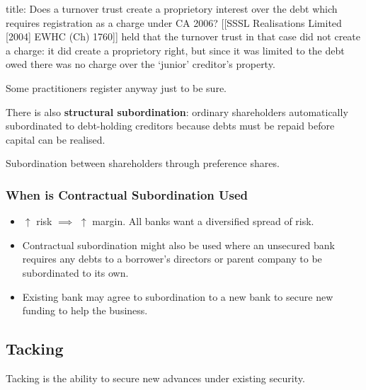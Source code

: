 \documentclass[
]{article}
\newenvironment{Shaded}{}{}
\newcommand{\NormalTok}[1]{#1}
\providecommand{\tightlist}{%
  \setlength{\itemsep}{0pt}\setlength{\parskip}{0pt}}
\begin{document}
\begin{Shaded}
\begin{Highlighting}[]
\NormalTok{title: Does a turnover trust create a proprietory interest over the debt which requires registration as a charge under CA 2006?}
\NormalTok{[[SSSL Realisations Limited [2004] EWHC (Ch) 1760]] held that the turnover trust in that case did not create a charge: it did create a proprietory right, but since it was limited to the debt owed there was no charge over the ‘junior’ creditor’s property.}

\NormalTok{Some practitioners register anyway just to be sure. }
\end{Highlighting}
\end{Shaded}

There is also \textbf{structural subordination}: ordinary shareholders
automatically subordinated to debt-holding creditors because debts must
be repaid before capital can be realised.

Subordination between shareholders through preference shares.

\hypertarget{when-is-contractual-subordination-used}{%
\subsubsection{When is Contractual Subordination
Used}\label{when-is-contractual-subordination-used}}

\begin{itemize}
\tightlist
\item
  \(\uparrow\) risk \(\implies\) \(\uparrow\) margin. All banks want a
  diversified spread of risk.
\item
  Contractual subordination might also be used where an unsecured bank
  requires any debts to a borrower's directors or parent company to be
  subordinated to its own.
\item
  Existing bank may agree to subordination to a new bank to secure new
  funding to help the business.
\end{itemize}

\hypertarget{tacking}{%
\subsection{Tacking}\label{tacking}}

\begin{Shaded}
\begin{Highlighting}[]
\NormalTok{Tacking is the ability to secure new advances under existing security.}
\end{Highlighting}
\end{Shaded}
\end{document}
